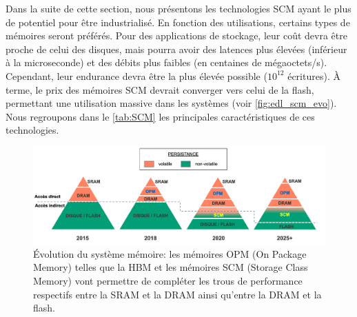         
        Dans la suite de cette section, nous présentons les technologies SCM ayant le plus de potentiel pour être industrialisé. En fonction des utilisations, certains types de mémoires seront préférés. Pour des applications de stockage, leur coût devra être proche de celui des disques, mais pourra avoir des latences plus élevées (inférieur à la microseconde) et des débits plus faibles (en centaines de mégaoctets/s). Cependant, leur endurance devra être la plus élevée possible ($10^{12}$ écritures). À terme, le prix des mémoires SCM devrait converger vers celui de la flash, permettant une utilisation massive dans les systèmes (voir \autoref{fig:edl_scm_evo}). Nous regroupons dans le \autoref{tab:SCM} les principales caractéristiques de ces technologies.
        
        
        \begin{figure}
        \center
        \includegraphics[width=17cm]{images/edl_scm_evo.png}
        \caption{\label{fig:edl_scm_evo} Évolution du système mémoire: les mémoires OPM (On Package Memory) telles que la HBM et les mémoires SCM (Storage Class Memory) vont permettre de compléter les trous de performance respectifs entre la SRAM et la DRAM ainsi qu'entre la DRAM et la flash.}
        \end{figure}
        
